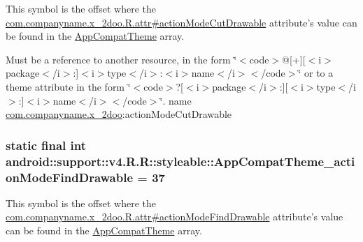This symbol is the offset where the \hyperlink{classcom_1_1companyname_1_1x__2doo_1_1_r_1_1attr_6f53e5cdd44209031ee1a63332a34c72}{com.companyname.x\_\-2doo.R.attr\#actionModeCutDrawable} attribute's value can be found in the \hyperlink{classandroid_1_1support_1_1v4_1_1_r_1_1styleable_0873e92ba21076bb5a4aeadeb7f5779f}{AppCompatTheme} array.

Must be a reference to another resource, in the form \char`\"{}$<$code$>$@\mbox{[}+\mbox{]}\mbox{[}$<$i$>$package$<$/i$>$:\mbox{]}$<$i$>$type$<$/i$>$:$<$i$>$name$<$/i$>$$<$/code$>$\char`\"{} or to a theme attribute in the form \char`\"{}$<$code$>$?\mbox{[}$<$i$>$package$<$/i$>$:\mbox{]}\mbox{[}$<$i$>$type$<$/i$>$:\mbox{]}$<$i$>$name$<$/i$>$$<$/code$>$\char`\"{}.  name \hyperlink{namespacecom_1_1companyname_1_1x__2doo}{com.companyname.x\_\-2doo}:actionModeCutDrawable \hypertarget{classandroid_1_1support_1_1v4_1_1_r_1_1styleable_4c89f9a8ad7b10afd63ffd919b6c656d}{
\subsubsection[{AppCompatTheme\_\-actionModeFindDrawable}]{\setlength{\rightskip}{0pt plus 5cm}static final int android::support::v4.R.R::styleable::AppCompatTheme\_\-actionModeFindDrawable = 37}}
\label{classandroid_1_1support_1_1v4_1_1_r_1_1styleable_4c89f9a8ad7b10afd63ffd919b6c656d}


This symbol is the offset where the \hyperlink{classcom_1_1companyname_1_1x__2doo_1_1_r_1_1attr_c54a1c011765defa86695a6c74cd6678}{com.companyname.x\_\-2doo.R.attr\#actionModeFindDrawable} attribute's value can be found in the \hyperlink{classandroid_1_1support_1_1v4_1_1_r_1_1styleable_0873e92ba21076bb5a4aeadeb7f5779f}{AppCompatTheme} array.

